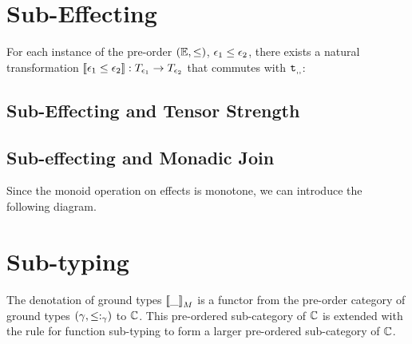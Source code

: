 {\section{Sub-Effecting}
For each instance of the pre-order $(\mathbb{E}, \leq)$, $\epsilon_1 \leq \epsilon_2$, there exists a natural transformation
${\bf [\![}\epsilon_1 \leq \epsilon_2{\bf ]\!]}: T_{\epsilon_1}{} \rightarrow T_{\epsilon_2}{}$ that commutes with $\texttt{t}_{, , }$:

\subsection{Sub-Effecting and Tensor Strength}

\subsection{Sub-effecting and Monadic Join}\label{SubEffectJoin}
Since the monoid operation on effects is monotone, we can introduce the following diagram.




\section{Sub-typing}

The denotation of ground types ${\bf [\![}\_{\bf ]\!]}_M$ is a functor from the pre-order category of ground types $(\gamma, \leq:_{\gamma})$
to $\mathbb{C}$. This pre-ordered sub-category of $\mathbb{C}$ is extended with the rule for function sub-typing to form a larger pre-ordered sub-category of $\mathbb{C}$.

}
